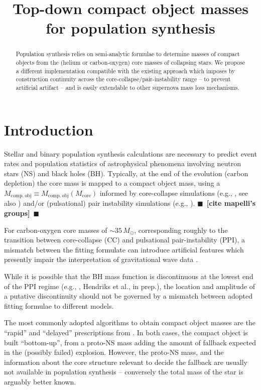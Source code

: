 \documentclass[twocolumn]{aastex63}
\newcommand{\todo}[1]{{\large $\blacksquare$~\textbf{\color{red}[#1]}}~$\blacksquare$}
\begin{document}
\title{Top-down compact object masses for population synthesis}


\begin{abstract}
  Population synthesis relies on semi-analytic formulae to determine
  masses of compact objects from the (helium or carbon-oxygen) core
  masses of collapsing stars. We propose a different implementation
  compatible with the existing approach which imposes by construction
  continuity across the core-collapse/pair-instability range -- to
  prevent artificial artifact -- and is easily extendable to other
  supernova mass loss mechanisms.
\end{abstract}

\section{Introduction}

Stellar and binary population synthesis calculations are necessary to
predict event rates and population statistics of astrophysical
phenomena involving neutron stars (NS) and
black holes (BH). Typically, at the end of the evolution (carbon
depletion) the core mass is mapped to a compact object mass, using a
$M_\mathrm{comp.\ obj}\equiv M_\mathrm{comp.\ obj}(M_\mathrm{core})$
informed by core-collapse simulations (e.g., \citealt{fryer:12,
  spera:15, mandel:20, couch:20}, see also \citealt{zapartas:21, patton:21}) and/or (pulsational) pair instability simulations
(e.g., \citealt{belczynski:16, woosley:17, stevenson:19, marchant:19, farmer:19}). \todo{cite
  mapelli's groups}

For carbon-oxygen core masses of $\sim{}35\,M_\odot$, corresponding
roughly to the transition between core-collapse (CC) and pulsational
pair-instability (PPI), a mismatch between the fitting formulate can
introduce artificial features which presently impair the
interpretation of gravitational wave data \citep[see e.g. the
corresponding feature in Fig.~5 of][]{vanson:21}.

While it is possible that the BH mass function is discontinuous at the
lowest end of the PPI regime (e.g., \citealt{renzo:20conv,costa:21},
Hendriks et al., in prep.), the location and amplitude of a putative
discontinuity should not be governed by a mismatch between adopted
fitting formulae to different models.

The most commonly adopted algorithms to obtain compact object masses
are the ``rapid'' and ``delayed'' prescriptions from
\cite{fryer:12}. In both cases, the compact object is built
``bottom-up'', from a proto-NS mass adding the amount of fallback
expected in the (possibly failed) explosion. However, the proto-NS
mass, and the information about the core structure relevant to decide
the fallback are usually not available in population synthesis
\citep[e.g.,][]{patton:20} -- conversely the total mass of the star is
arguably better known.
\end{document}
